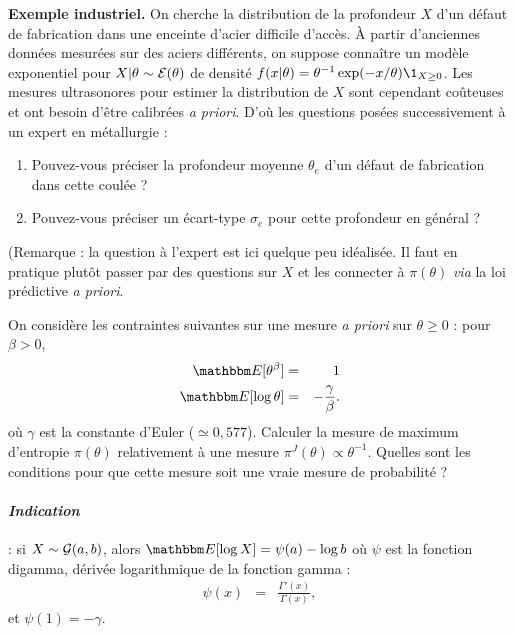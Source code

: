 \documentclass[10pt]{article}
\begin{document}
\if{} \vspace{1cm} 
\begin{exec}{\bf Exemple industriel.}
On cherche la distribution de la profondeur  $X$ d'un défaut de fabrication dans une enceinte d'acier difficile d'accès. \`A partir d'anciennes données  mesurées sur des aciers différents, on suppose connaître un modèle exponentiel pour $X|\theta\sim {\cal{E}}(\theta)$ de densité $f(x|\theta)=\theta^{-1} \exp(-x/\theta)\1_{X\geq 0}$. Les mesures ultrasonores pour estimer la distribution de $X$ sont cependant coûteuses et ont besoin d'être calibrées {\it a priori}. D'où les questions posées successivement à un expert en métallurgie :
\begin{enumerate}
    \item Pouvez-vous préciser la profondeur moyenne $\theta_e$ d'un défaut de fabrication dans cette coulée ?
    \item Pouvez-vous préciser un écart-type $\sigma_e$ pour cette profondeur en général ? 
\end{enumerate}
(Remarque : la question à l'expert est ici quelque peu idéalisée. Il faut en pratique plutôt passer par des questions sur $X$ et les connecter à $\pi(\theta)$ {\it via} la loi prédictive {\it a priori}.
\end{exec}


\fi
\vspace{0.5cm}

\if{} \vspace{1cm} 
\begin{exec}
On considère les contraintes suivantes sur une mesure {\it a priori} sur $\theta\geq 0$ : pour $\beta>0$, 
\begin{eqnarray}
\E[\theta^{\beta}] & = & 1 \label{constrainte1toto} \\
\E[\log \theta] & = & -\frac{\gamma}{\beta}. \label{constrainte2toto}
\end{eqnarray}
où $\gamma$ est la constante d'Euler ($\simeq 0,577$).
Calculer la mesure de maximum d'entropie $\pi(\theta)$ relativement à une mesure $\pi^J(\theta)\propto \theta^{-1}$. Quelles sont les conditions pour que cette mesure soit une vraie mesure de probabilité ? \\

\paragraph{\it Indication} : si $X\sim {\cal{G}}(a,b)$, alors $\E[\log X]=\psi(a)-\log b$ où $\psi$ est la fonction digamma, dérivée logarithmique de la fonction gamma :  
\begin{eqnarray*}
\psi(x) & = & \frac{\Gamma'(x)}{\Gamma(x)},
\end{eqnarray*}
et $\psi(1)=-\gamma$. 
\end{exec}
\end{document}
